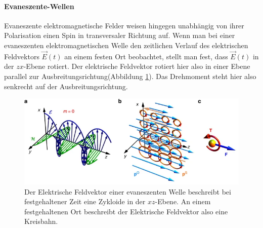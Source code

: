 \documentclass[titlepage]{article}
\begin{document}
	\paragraph{Evaneszente-Wellen}	
	Evaneszente elektromagnetische Felder weisen hingegen unabhängig von ihrer Polarisation einen Spin in transversaler Richtung auf. Wenn man bei einer evaneszenten elektromagnetischen Welle den zeitlichen Verlauf des elektrischen Feldvektors $\vec{E}(t)$ an einem festen Ort beobachtet, stellt man fest, dass $\vec{E}(t)$ in der $zx$-Ebene rotiert. Der elektrische Feldvektor rotiert hier also in einer Ebene parallel zur Ausbreitungsrichtung(Abbildung \ref{fig:ev_spin}). Das Drehmoment steht hier also senkrecht auf der Ausbreitungsrichtung. \cite{Bliokh.2014}	
	
	\begin{figure}[h]
		\centering
		\includegraphics[width=0.7\linewidth]{figures/spin/ev_spin}
		\caption{Der Elektrische Feldvektor einer evaneszenten Welle beschreibt bei festgehaltener Zeit eine Zykloide in der $xz$-Ebene. An einem festgehaltenen Ort beschreibt der Elektrische Feldvektor also eine Kreisbahn.}
		\label{fig:ev_spin}
	\end{figure}
\end{document}
